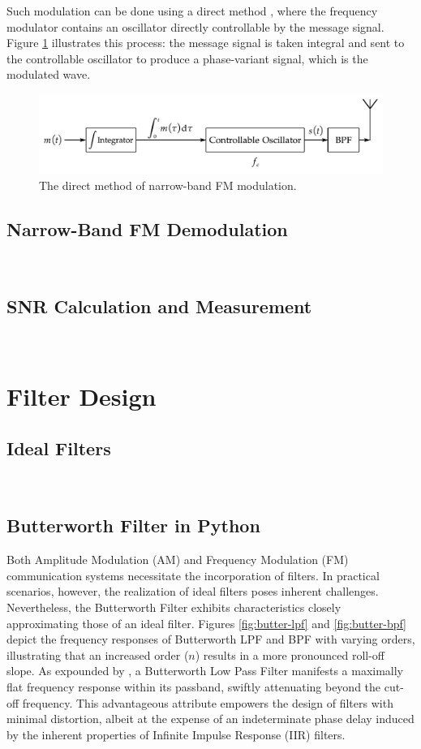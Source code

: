 \documentclass[../ECE459FinalProjectReport.tex]{subfiles}
\begin{document}
Such modulation can be done using a direct method \cite[Sec. 4.7]{haykinIntroductionAnalogDigital2007}, where the frequency modulator contains an oscillator directly controllable by the message signal. Figure \ref{fig:fm-mod} illustrates this process: the message signal is taken integral and sent to the controllable oscillator to produce a phase-variant signal, which is the modulated wave.


\begin{figure}[htb]
    \centering
    \includegraphics[scale=0.6]{plots/fm_mod.pdf}
    \caption{The direct method of narrow-band FM modulation.}
    \label{fig:fm-mod}
\end{figure}


\subsection{Narrow-Band FM Demodulation}
~
\subsection{SNR Calculation and Measurement}
~

\section{Filter Design}
\subsection{Ideal Filters}
~
\subsection{Butterworth Filter in Python}

Both Amplitude Modulation (AM) and Frequency Modulation (FM) communication systems necessitate the incorporation of filters. In practical scenarios, however, the realization of ideal filters poses inherent challenges. Nevertheless, the Butterworth Filter exhibits characteristics closely approximating those of an ideal filter. Figures \ref{fig:butter-lpf} and \ref{fig:butter-bpf} depict the frequency responses of Butterworth LPF and BPF with varying orders, illustrating that an increased order ($n$) results in a more pronounced roll-off slope. As expounded by \cite{storrButterworthFilterDesign2013, kudekiAnalogSignalsSystems2009}, a Butterworth Low Pass Filter manifests a maximally flat frequency response within its passband, swiftly attenuating beyond the cut-off frequency. This advantageous attribute empowers the design of filters with minimal distortion, albeit at the expense of an indeterminate phase delay induced by the inherent properties of Infinite Impulse Response (IIR) filters.
\end{document}

